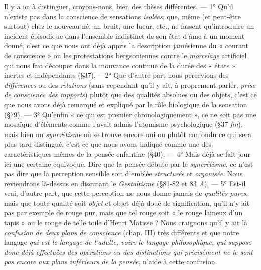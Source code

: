 Il y a ici à distinguer, croyons-nous, bien des thèses différentes. —
1° Qu’il n’existe pas dans la conscience de sensations {\it isolées}, que,
même (et peut-être surtout) chez le nouveau-né, un bruit, une
lueur, etc., ne fassent qu’introduire un incident épisodique dans l’ensemble
indistinct de son état d’âme à un moment donné, c’est ce que
nous ont déjà appris la description jamésienne du « courant de conscience »
ou les protestations bergsoniennes contre le {\it morcelage} artificiel
qui nous fait découper dans la mouvance continue de la durée
des « états » inertes et indépendants (\S 37). —2° Que d’autre part
nous percevions des {\it différences} ou des {\it relations} (sans cependant qu’il
y ait, à proprement parler, {\it prise de conscience des rapports}) plutôt
que des qualités absolues ou des objets, c'est ce que nous avons
déjà remarqué et expliqué par le rôle biologique de la sensation (\S 79).
— 3° Qu’enfin « ce qui est premier chronologiquement », ce ne soit
pas une mosaïque d’éléments comme l’avait admis l’atomisme psychologique
(\S 37 {\it fin}), mais bien un {\it syncrétisme} où se trouve encore
uni ou plutôt confondu ce qui sera plus tard distingué, c’est ce que
nous avons indiqué comme une des caractéristiques mêmes de la
pensée enfantine (\S 40). — 4° Mais déjà se fait jour ici une certaine
équivoque. Dire que la pensée débute par le {\it syncrétisme}, ce n’est pas
dire que la perception sensible soit d'emblée {\it structurée} et {\it organisée}.
Nous reviendrons là-dessus en discutant le {\it Gestaltisme} (\S 81-82 et
83 {\it A}). — 5° Est-il vrai, d’autre part, que cette perception ne nous
donne jamais de {\it qualités pures}, mais que toute qualité soit {\it objet} et
objet déjà doué de signification, qu’il n’y ait pas par exemple de
rouge pur, mais que tel rouge soit « le rouge laineux d’un tapis » ou
le rouge de telle toile d'Henri Matisse ? Nous craignons qu’il y ait
là {\it confusion de deux plans de conscience} (chap. III) très différents
et que notre langage {\it qui est le langage de l’adulte, voire le langage
philosophique, qui suppose donc déjà effectuées des opérations ou des
distinctions qui précisément ne le sont pas encore aux plans inférieurs
de la pensée}, n’aide à cette confusion.

